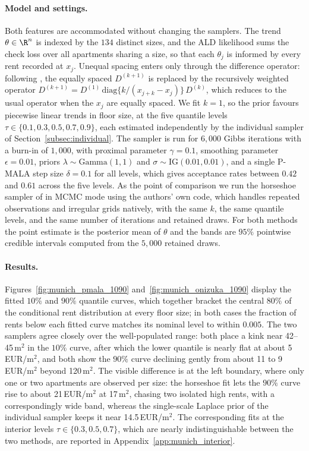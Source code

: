 \paragraph{Model and settings.} Both features are accommodated without changing the samplers. The trend $\theta \in \R^{n}$ is indexed by the $134$ distinct sizes, and the ALD likelihood sums the check loss over all apartments sharing a size, so that each $\theta_j$ is informed by every rent recorded at $x_j$. Unequal spacing enters only through the difference operator: following \citet{onizuka2024fast}, the equally spaced $D^{(k+1)}$ is replaced by the recursively weighted operator $D^{(k+1)} = D^{(1)}\,\mathrm{diag}\{k/(x_{j+k} - x_j)\}\,D^{(k)}$, which reduces to the usual operator when the $x_j$ are equally spaced. We fit $k = 1$, so the prior favours piecewise linear trends in floor size, at the five quantile levels $\tau \in \{0.1, 0.3, 0.5, 0.7, 0.9\}$, each estimated independently by the individual sampler of Section~\ref{subsec:individual}. The sampler is run for $6{,}000$ Gibbs iterations with a burn-in of $1{,}000$, with proximal parameter $\gamma = 0.1$, smoothing parameter $\epsilon = 0.01$, priors $\lambda \sim \mathrm{Gamma}(1,1)$ and $\sigma \sim \mathrm{IG}(0.01, 0.01)$, and a single P-MALA step size $\delta = 0.1$ for all levels, which gives acceptance rates between $0.42$ and $0.61$ across the five levels. As the point of comparison we run the horseshoe sampler of \citet{onizuka2024fast} in MCMC mode using the authors' own code, which handles repeated observations and irregular grids natively, with the same $k$, the same quantile levels, and the same number of iterations and retained draws. For both methods the point estimate is the posterior mean of $\theta$ and the bands are $95\%$ pointwise credible intervals computed from the $5{,}000$ retained draws.

\paragraph{Results.} Figures~\ref{fig:munich_pmala_1090} and~\ref{fig:munich_onizuka_1090} display the fitted $10\%$ and $90\%$ quantile curves, which together bracket the central $80\%$ of the conditional rent distribution at every floor size; in both cases the fraction of rents below each fitted curve matches its nominal level to within $0.005$. The two samplers agree closely over the well-populated range: both place a kink near 42--45\,m$^2$ in the $10\%$ curve, after which the lower quantile is nearly flat at about 5\,EUR/m$^2$, and both show the $90\%$ curve declining gently from about 11 to 9\,EUR/m$^2$ beyond 120\,m$^2$. The visible difference is at the left boundary, where only one or two apartments are observed per size: the horseshoe fit lets the $90\%$ curve rise to about 21\,EUR/m$^2$ at 17\,m$^2$, chasing two isolated high rents, with a correspondingly wide band, whereas the single-scale Laplace prior of the individual sampler keeps it near 14.5\,EUR/m$^2$. The corresponding fits at the interior levels $\tau \in \{0.3, 0.5, 0.7\}$, which are nearly indistinguishable between the two methods, are reported in Appendix~\ref{app:munich_interior}.

